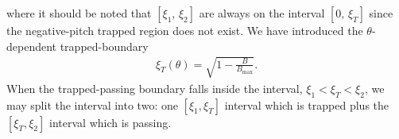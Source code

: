 \documentclass[11pt,a4paper]{article}
\newcommand{\sub}[1]{\ensuremath{_{\text{#1}}}}
\begin{document}
where it should be noted that $[\xi_1,\,\xi_2]$ are always on the interval $[0,\,\xi_T]$ since the negative-pitch trapped region does not exist.
We have introduced the $\theta$-dependent trapped-boundary
\begin{align}
\xi_T(\theta) = \sqrt{1-\frac{B}{B\sub{max}}}.
\end{align}
When the trapped-passing boundary falls inside the interval, $\xi_1 < \xi_T < \xi_2$, we may split the interval into two: one $[\xi_1,\xi_T]$ interval which is trapped plus the $[\xi_T,\xi_2]$ interval which is passing.  
\end{document}
